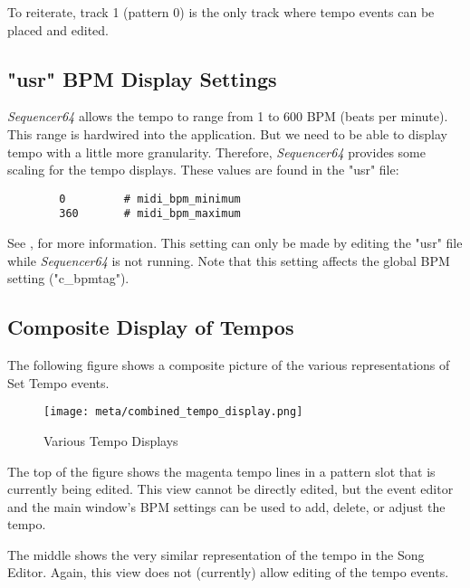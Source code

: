    To reiterate, track 1 (pattern 0) is the only track where tempo events
   can be placed and edited.

\subsection{"usr" BPM Display Settings}
\label{subsec:meta_events_usr}

   \textsl{Sequencer64} allows the tempo to range from 1 to 600 BPM
   (beats per minute).
   This range is hardwired into the application.
   But we need to be able to display tempo with a little more granularity.
   Therefore, \textsl{Sequencer64} provides some scaling for the tempo
   displays.  These values are found in the "usr" file:

   \begin{verbatim}
		0         # midi_bpm_minimum
		360       # midi_bpm_maximum
   \end{verbatim}

   See , for more
   information.  This setting can only be made by editing the "usr" file
   while \textsl{Sequencer64} is not running.
   Note that this setting affects the global BPM setting ("c\_bpmtag").


\subsection{Composite Display of Tempos}
\label{subsec:meta_events_composite_display}

The following figure shows a composite picture of the various representations
of Set Tempo events.

\begin{figure}[H]
   \centering 
   \texttt{[image: meta/combined\_tempo\_display.png]}
   \caption{Various Tempo Displays}
   \label{fig:meta_events_tempo_displays}
\end{figure}

The top of the figure shows the magenta tempo lines in a pattern slot that
is currently being edited.  This view cannot be directly edited, but the event
editor and the main window's BPM settings can be used to add, delete, or adjust
the tempo.

The middle shows the very similar representation of the tempo in the Song
Editor.  Again, this view does not (currently) allow editing of the tempo
events.

